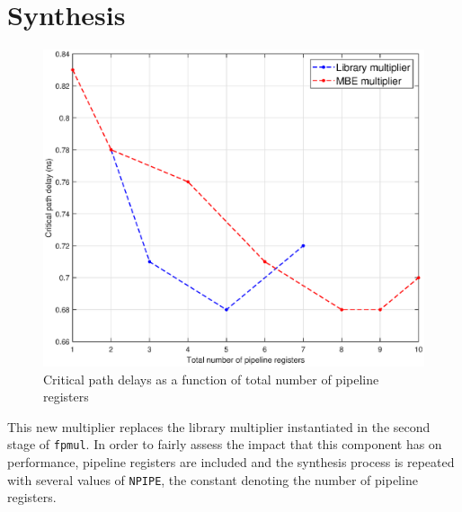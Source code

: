 \section{Synthesis}
\begin{figure}
    \includegraphics[width=\textwidth]{chapter2/images/delays.eps}
    \caption{Critical path delays as a function of total number of pipeline registers}
    \label{fig:delays}
\end{figure}
This new multiplier replaces the library multiplier instantiated in the second stage of \texttt{fpmul}. In order to fairly assess the impact that this component has on performance, pipeline registers are included and the synthesis process is repeated with several values of \texttt{NPIPE}, the constant denoting the number of pipeline registers.
\begin{table}[htbp]
\caption{Characterization of the MBE multiplier}
\label{tab:MBE}
\end{table}

